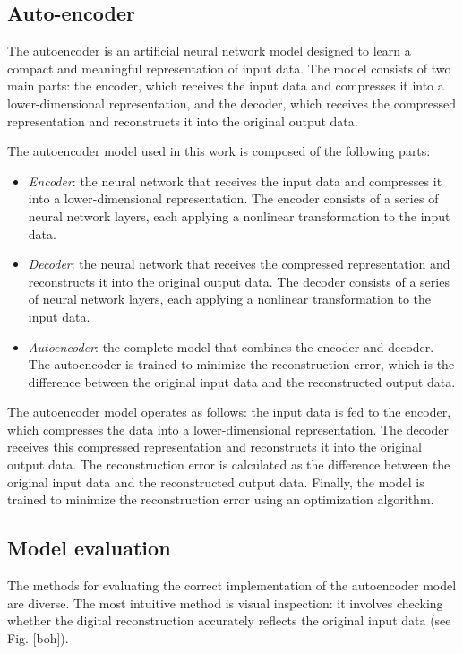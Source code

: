 \documentclass[9pt,technote]{IEEEtran}
\begin{document}
\subsection{Auto-encoder}
The autoencoder is an artificial neural network model designed to learn a compact and meaningful representation of input data. The model consists of two main parts: the encoder, which receives the input data and compresses it into a lower-dimensional representation, and the decoder, which receives the compressed representation and reconstructs it into the original output data.

The autoencoder model used in this work is composed of the following parts:
\begin{itemize}
	\item \textit{Encoder}: the neural network that receives the input data and compresses it into a lower-dimensional representation. The encoder consists of a series of neural network layers, each applying a nonlinear transformation to the input data.
	\item \textit{Decoder}: the neural network that receives the compressed representation and reconstructs it into the original output data. The decoder consists of a series of neural network layers, each applying a nonlinear transformation to the input data.
	\item \textit{Autoencoder}: the complete model that combines the encoder and decoder. The autoencoder is trained to minimize the reconstruction error, which is the difference between the original input data and the reconstructed output data.
\end{itemize}

The autoencoder model operates as follows: the input data is fed to the encoder, which compresses the data into a lower-dimensional representation. The decoder receives this compressed representation and reconstructs it into the original output data. The reconstruction error is calculated as the difference between the original input data and the reconstructed output data. Finally, the model is trained to minimize the reconstruction error using an optimization algorithm.

\subsection{Model evaluation}
The methods for evaluating the correct implementation of the autoencoder model are diverse.
The most intuitive method is visual inspection: it involves checking whether the digital reconstruction accurately reflects the original input data (see Fig. [boh]).
\end{document}
